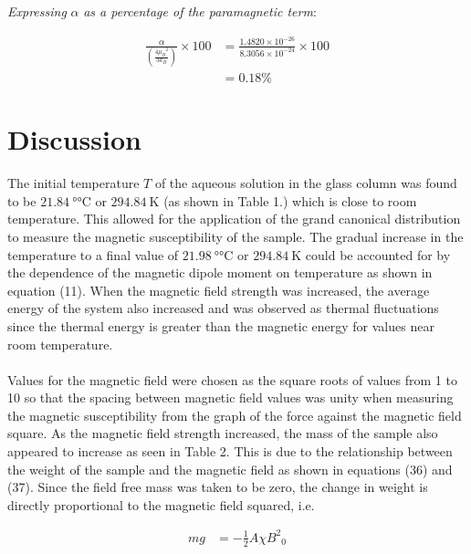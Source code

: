 \documentclass[a4paper,11pt]{article}
\begin{document}
\textit{Expressing} $\alpha$ \textit{as a percentage of the paramagnetic term}:

\begin{align}
\frac{\alpha}{\left( \frac{4 {\mu_B}^2}{3 k_B} \right)} \times 100	& = \frac{1.4820 \times 10^{-26}}{8.3056 \times 10^{-24}} \times 100\nonumber\\
																	& = 0.18\%
\end{align}

\clearpage
\section{Discussion}

The initial temperature $T$ of the aqueous solution in the glass column was found to be $\SI{21.84}{\degree\celsius}$ or $\SI{294.84}{\kelvin}$ (as shown in Table 1.) which is close to room temperature. This allowed for the application of the grand canonical distribution to measure the magnetic susceptibility of the sample. The gradual increase in the temperature to a final value of $\SI{21.98}{\degree\celsius}$ or $\SI{294.84}{\kelvin}$ could be accounted for by the dependence of the magnetic dipole moment on temperature as shown in equation (11). When the magnetic field strength was increased, the average energy of the system also increased and was observed as thermal fluctuations since the thermal energy is greater than the magnetic energy for values near room temperature.\\
\\
Values for the magnetic field were chosen as the square roots of values from 1 to 10 so that the spacing between magnetic field values was unity when measuring the magnetic susceptibility from the graph of the force against the magnetic field square. As the magnetic field strength increased, the mass of the sample also appeared to increase as seen in Table 2. This is due to the relationship between the weight of the sample and the magnetic field  as shown in equations (36) and (37). Since the field free mass was taken to be zero, the change in weight is directly proportional to the magnetic field squared, i.e.

\begin{align}
mg	& = -\frac{1}{2} A \chi {B^2}_0\nonumber 
\end{align} 
\end{document}
